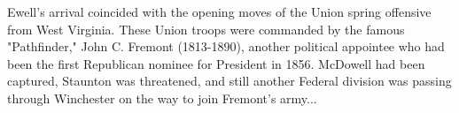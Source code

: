 Ewell's arrival coincided with the opening moves of the Union spring offensive
from West Virginia. These Union troops were commanded by the famous
"Pathfinder," John C. Fremont (1813-1890), another political appointee who had
been the first Republican nominee for President in 1856. McDowell had been
captured, Staunton was threatened, and still another Federal division was
passing through Winchester on the way to join Fremont's army...
